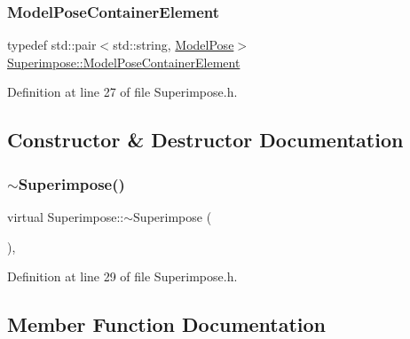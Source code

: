 \subsubsection{\texorpdfstring{Model\+Pose\+Container\+Element}{ModelPoseContainerElement}}
{\footnotesize\ttfamily typedef std\+::pair$<$std\+::string, \mbox{\hyperlink{classSuperimpose_a85d40a5caf19f486d1e0c15c0a025378}{Model\+Pose}}$>$ \mbox{\hyperlink{classSuperimpose_a1e02e0225687b42296dcfee4eadf8a55}{Superimpose\+::\+Model\+Pose\+Container\+Element}}}



Definition at line 27 of file Superimpose.\+h.



\subsection{Constructor \& Destructor Documentation}
\mbox{\label{classSuperimpose_a9e32031994dc105b1572e7a6db26b41b}} 
\subsubsection{\texorpdfstring{$\sim$\+Superimpose()}{~Superimpose()}}
{\footnotesize\ttfamily virtual Superimpose\+::$\sim$\+Superimpose (\begin{DoxyParamCaption}{ }\end{DoxyParamCaption})\hspace{0.3cm}{\ttfamily [inline]}, {\ttfamily [virtual]}}



Definition at line 29 of file Superimpose.\+h.



\subsection{Member Function Documentation}
\mbox{\label{classSuperimpose_a62c4c269b8fc34cc36d3d54fa4acb35c}} 
